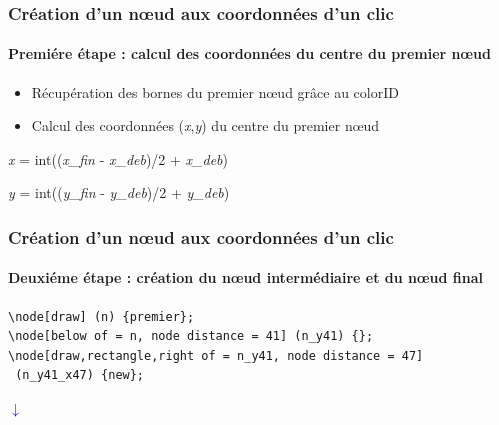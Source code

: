 \documentclass{beamer}
\begin{document}
\begin{frame}
\frametitle{Création d'un n{\oe}ud aux coordonnées d'un clic} 
\framesubtitle{Premiére étape : calcul des coordonnées du centre du premier n{\oe}ud}
\begin{itemize}
\item Récupération des bornes du premier n{\oe}ud grâce au colorID
\end{itemize}

\begin{itemize}
\item Calcul des coordonnées (\textit{x},\textit{y}) du centre du premier n{\oe}ud
\end{itemize}
\begin{center}
\textit{x} = int((\textit{x\_fin} - \textit{x\_deb})/2 + \textit{x\_deb})

\textit{y} = int((\textit{y\_fin} - \textit{y\_deb})/2 + \textit{y\_deb})
\end{center}
\end{frame}

\begin{frame}[containsverbatim]
\frametitle{Création d'un n{\oe}ud aux coordonnées d'un clic} 
\framesubtitle{Deuxiéme étape : création du n{\oe}ud intermédiaire et du n{\oe}ud final}
\begin{verbatim}
\node[draw] (n) {premier};
\node[below of = n, node distance = 41] (n_y41) {};
\node[draw,rectangle,right of = n_y41, node distance = 47]
 (n_y41_x47) {new};
\end{verbatim}
 
\begin{center}
{\normalsize \textcolor{blue}{$\downarrow$}}\\
\vspace{3mm}


\end{center}

\end{frame}
\end{document}
